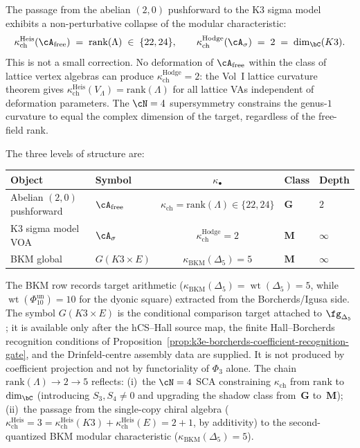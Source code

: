 \begin{remark}
\label{rem:kappa-collapse}
The passage from the abelian $(2,0)$ pushforward to the K3 sigma
model exhibits a non-perturbative collapse of the modular
characteristic:
\[
 \kappa_{\mathrm{ch}}^{\mathrm{Heis}}(\cA_{\mathrm{free}}) \;=\; \mathrm{rank}(\Lambda)
 \;\in\; \{22, 24\},
 \qquad
 \kappa_{\mathrm{ch}}^{\mathrm{Hodge}}(\cA_\sigma) \;=\; 2 \;=\; \dim_\bC(K3).
\]
This is not a small correction. No deformation of
$\cA_{\mathrm{free}}$ within the class of lattice vertex algebras
can produce $\kappa_{\mathrm{ch}}^{\mathrm{Hodge}} = 2$: the Vol~I lattice curvature theorem gives
$\kappa_{\mathrm{ch}}^{\mathrm{Heis}}(V_\Lambda) = \mathrm{rank}(\Lambda)$ for all lattice VAs
independent of deformation parameters.
The $\cN = 4$ supersymmetry constrains the genus-$1$ curvature to
equal the complex dimension of the target, regardless of the
free-field rank.

\medskip
The three levels of structure are:
\begin{center}
\renewcommand{\arraystretch}{1.3}
\begin{tabular}{llcll}
 \toprule
 \textbf{Object} & \textbf{Symbol} & $\kappa_\bullet$ & \textbf{Class}
 & \textbf{Depth} \\
 \midrule
 Abelian $(2,0)$ pushforward & $\cA_{\mathrm{free}}$
 & $\kappa_{\mathrm{ch}} = \mathrm{rank}(\Lambda) \in \{22, 24\}$
 & $\mathbf{G}$ & $2$ \\
 K3 sigma model VOA & $\cA_\sigma$
 & $\kappa_{\mathrm{ch}}^{\mathrm{Hodge}} = 2$ & $\mathbf{M}$ & $\infty$ \\
 BKM global & $G(K3 \times E)$
 & $\kappa_{\mathrm{BKM}}(\Delta_5) = 5$ & $\mathbf{M}$ & $\infty$ \\
 \bottomrule
\end{tabular}
\end{center}
The BKM row records target arithmetic
($\kappa_{\mathrm{BKM}}(\Delta_5) =
\operatorname{wt}(\Delta_5) = 5$, while
\(\operatorname{wt}(\Phi_{10}^{\mathrm{un}})=10\) for the dyonic square)
extracted from the Borcherds/Igusa side. The symbol
$G(K3 \times E)$ is the conditional comparison target attached to
$\fg_{\Delta_5}$; it is available only after the hCS--Hall source map,
the finite Hall--Borcherds recognition conditions of
Proposition~\ref{prop:k3e-borcherds-coefficient-recognition-gate}, and
the Drinfeld-centre assembly data are supplied. It is not produced by
coefficient projection and not by functoriality of $\Phi_3$ alone. The chain
$\mathrm{rank}(\Lambda) \to 2 \to 5$ reflects: (i)~the
$\cN = 4$ SCA constraining $\kappa_{\mathrm{ch}}$ from $\mathrm{rank}$ to
$\dim_\bC$ (introducing $S_3, S_4 \neq 0$ and upgrading the
shadow class from~$\mathbf{G}$ to~$\mathbf{M}$); (ii)~the passage
from the single-copy chiral algebra
($\kappa_{\mathrm{ch}}^{\mathrm{Heis}} = 3 = \kappa_{\mathrm{ch}}^{\mathrm{Heis}}(K3) + \kappa_{\mathrm{ch}}^{\mathrm{Heis}}(E) = 2 + 1$,
by additivity) to the second-quantized BKM modular characteristic
($\kappa_{\mathrm{BKM}}(\Delta_5) = 5$).
\end{remark}
